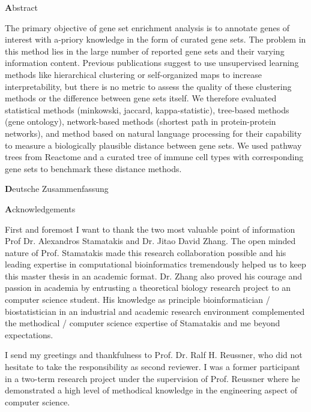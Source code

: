 \documentclass{thesisclass}
\begin{document}
\begin{addmargin}{0.5cm}

\centerline{\textbf Abstract}

The primary objective of gene set enrichment analysis is to annotate genes of interest with a-priory knowledge in the form of curated gene sets. The problem in this method lies in the large number of reported gene sets and their varying information content. Previous publications suggest to use unsupervised learning methods like hierarchical clustering or self-organized maps to increase interpretability, but there is no metric to assess the quality of these clustering methods or the difference between gene sets itself. We therefore evaluated statistical methods (minkowski, jaccard, kappa-statistic), tree-based methods (gene ontology), network-based methods (shortest path in protein-protein networks), and method based on natural language processing for their capability to measure a biologically plausible distance between gene sets. We used pathway trees from Reactome and a curated tree of immune cell types with corresponding gene sets to benchmark these distance methods. 

\vskip 2cm

\centerline{\textbf Deutsche Zusammenfassung}



\vskip 2cm

\newpage

\centerline{\textbf Acknowledgements}

First and foremost I want to thank the two most valuable point of information Prof Dr. Alexandros Stamatakis and Dr. Jitao David Zhang. The open minded nature of Prof. Stamatakis made this research collaboration possible and his leading expertise in computational bioinformatics tremendously helped us to keep this master thesis in an academic format. Dr. Zhang also proved his courage and passion in academia by entrusting a theoretical biology research project to an computer science student. His knowledge as principle bioinformatician / biostatistician in an industrial and academic research environment complemented the methodical / computer science expertise of Stamatakis and me beyond expectations.

I send my greetings and thankfulness to Prof. Dr. Ralf H. Reussner, who did not hesitate to take the responsibility as second reviewer. I was a former participant in a two-term research project under the supervision of Prof. Reussner where he demonstrated a high level of methodical knowledge in the engineering aspect of computer science. 


\end{addmargin}
\end{document}
